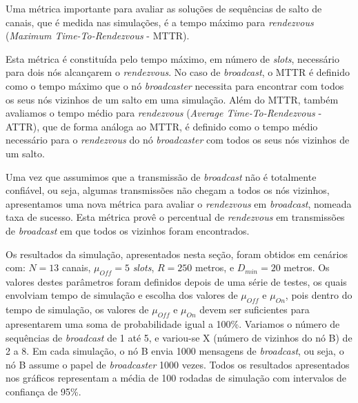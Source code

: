 Uma métrica importante para avaliar as soluções de sequências de salto de canais, que é medida nas simulações, é a tempo máximo para {\it rendezvous} ({\it Maximum Time-To-Rendezvous} - MTTR). { Esta métrica é constituída pelo tempo máximo, em número de {\it slots}, necessário para dois nós alcançarem o {\it rendezvous}. No caso de {\it broadcast}, o MTTR é definido como o tempo máximo que o nó {\it broadcaster} necessita para encontrar com todos os seus nós vizinhos de um salto em uma simulação. Além do MTTR, também avaliamos o tempo médio para {\it rendezvous} ({\it Average Time-To-Rendezvous} - ATTR), que de forma análoga ao MTTR, é definido como o tempo médio necessário para o {\it rendezvous} do nó {\it broadcaster} com todos os seus nós vizinhos de um salto.


Uma vez que assumimos que a transmissão de {\it broadcast} não é totalmente confiável, ou seja, algumas transmissões não chegam a todos os nós vizinhos, apresentamos uma nova métrica para avaliar o {\it rendezvous} em {\it broadcast}, nomeada taxa de sucesso. Esta métrica provê o percentual de {\it rendezvous} em transmissões de {\it broadcast} em que todos os vizinhos foram encontrados. %




Os resultados da simulação, apresentados nesta seção, foram obtidos em cenários com: $N=13$ canais, $\mu_{Off}=5$ {\it slots}, $R=250$ metros, e $D_{min}=20$ metros.
Os valores destes parâmetros foram definidos depois de uma série de testes, os quais envolviam tempo de simulação e escolha dos valores de $\mu_{Off}$ e $\mu_{On}$, pois dentro do tempo de simulação, os valores de $\mu_{Off}$ e $\mu_{On}$ devem ser suficientes para apresentarem uma soma de probabilidade igual a 100\%. Variamos o número de sequências de {\it broadcast} de 1 até 5, e variou-se X (número de vizinhos do nó B) de 2 a 8. Em cada simulação, o nó B envia 1000 mensagens de {\it broadcast}, ou seja, o nó B assume o papel de {\it broadcaster} 1000 vezes. Todos os resultados apresentados nos gráficos representam a média de 100 rodadas de simulação com intervalos de confiança de 95\%.


}
